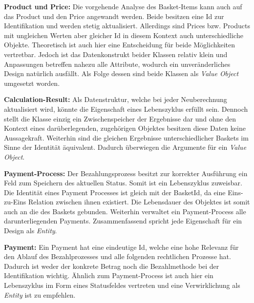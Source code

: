 {	\item \textbf{Product und Price: } {Die vorgehende Analyse des Basket-Items kann auch auf das Product und den Price angewandt werden. Beide besitzen eine Id zur Identifikation und werden stetig aktualisiert. Allerdings sind Prices bzw. Products mit ungleichen Werten aber gleicher Id in diesem Kontext auch unterschiedliche Objekte. Theoretisch ist auch hier eine Entscheidung für beide Möglichkeiten vertretbar. Jedoch ist das Datenkonstrukt beider Klassen relativ klein und Anpassungen betreffen nahezu alle Attribute, wodurch ein unveränderliches Design natürlich ausfällt. Als Folge dessen sind beide Klassen als \emph{Value Object} umgesetzt worden. }
	\item \textbf{Calculation-Result: } {Als Datenstruktur, welche bei jeder Neuberechnung aktualisiert wird, könnte die Eigenschaft eines Lebenszyklus erfüllt sein. Dennoch stellt die Klasse einzig ein Zwischenspeicher der Ergebnisse dar und ohne den Kontext eines darüberlegenden, zugehörigen Objektes besitzen diese Daten keine Aussagekraft. Weiterhin sind die gleichen Ergebnisse unterschiedlicher Baskets im Sinne der Identität äquivalent. Dadurch überwiegen die Argumente für ein \emph{Value Object}.}
	\item \textbf{Payment-Process: } {Der Bezahlungsprozess besitzt zur korrekter Ausführung ein Feld zum Speichern des aktuellen Status. Somit ist ein Lebenszyklus zuweisbar. Die Identität eines Payment Processes ist gleich mit der BasketId, da eine Eins-zu-Eins Relation zwischen ihnen existiert. Die Lebensdauer des Objektes ist somit auch an die des Baskets gebunden. Weiterhin verwaltet ein Payment-Process alle darunterliegenden Payments. Zusammenfassend spricht jede Eigenschaft für ein Design als \emph{Entity}.}
	\item \textbf{Payment: } {Ein Payment hat eine eindeutige Id, welche eine hohe Relevanz für den Ablauf des Bezahlprozesses und alle folgenden rechtlichen Prozesse hat. Dadurch ist weder der konkrete Betrag noch die Bezahlmethode bei der Identifikation wichtig. Ähnlich zum Payment-Process ist auch hier ein Lebenszyklus im Form eines Statusfeldes vertreten und eine Verwirklichung als \emph{Entity} ist zu empfehlen.}
}



